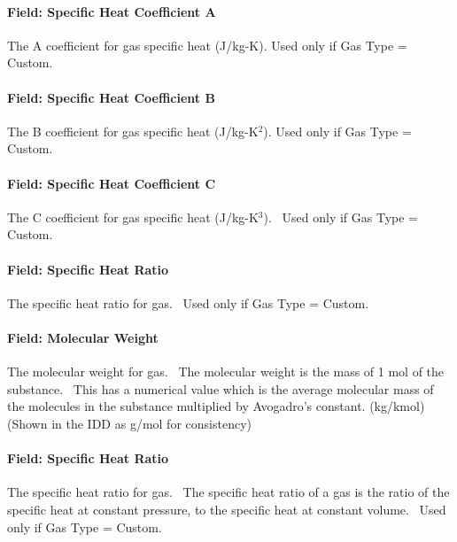 \paragraph{Field: Specific Heat Coefficient A}\label{field-specific-heat-coefficient-a}

The A coefficient for gas specific heat (J/kg-K). Used only if Gas Type = Custom.

\paragraph{Field: Specific Heat Coefficient B}\label{field-specific-heat-coefficient-b}

The B coefficient for gas specific heat (J/kg-K\(^{2}\)). Used only if Gas Type = Custom.

\paragraph{Field: Specific Heat Coefficient C}\label{field-specific-heat-coefficient-c}

The C coefficient for gas specific heat (J/kg-K\(^{3}\)).~ Used only if Gas Type = Custom.

\paragraph{Field: Specific Heat Ratio}\label{field-specific-heat-ratio}

The specific heat ratio for gas.~ Used only if Gas Type = Custom.

\paragraph{Field: Molecular Weight}\label{field-molecular-weight}

The molecular weight for gas.~ The molecular weight is the mass of 1 mol of the substance.~ This has a numerical value which is the average molecular mass of the molecules in the substance multiplied by Avogadro's constant. (kg/kmol) (Shown in the IDD as g/mol for consistency)

\paragraph{Field: Specific Heat Ratio}\label{field-specific-heat-ratio-1}

The specific heat ratio for gas.~ The specific heat ratio of a gas is the ratio of the specific heat at constant pressure, to the specific heat at constant volume.~ Used only if Gas Type = Custom.

